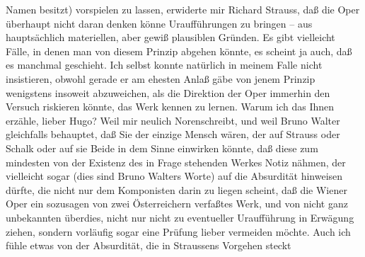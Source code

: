 \begin{ledgroupsized}[t]{13cm}
               Namen besitzt) vorspielen zu lassen, erwiderte mir Richard Strauss, daß die Oper überhaupt
               nicht daran denken könne Uraufführungen zu bringen – aus hauptsächlich materiellen,
               aber gewiß plausiblen Gründen. Es gibt vielleicht Fälle, in denen man von diesem
               Prinzip abgehen könnte, es scheint ja auch, daß es manchmal geschieht. Ich selbst
               konnte natürlich in meinem Falle nicht insistieren, obwohl gerade er am ehesten Anlaß
               gäbe von jenem Prinzip wenigstens insoweit abzuweichen, als die Direktion der Oper immerhin den Versuch riskieren könnte, das
               Werk kennen zu lernen. Warum ich das Ihnen erzähle, lieber Hugo? Weil mir neulich Norenschreibt, und weil Bruno Walter gleichfalls behauptet, daß Sie der einzige Mensch
               wären, der auf Strauss oder Schalk oder auf sie Beide in dem Sinne
               einwirken könnte, daß diese zum mindesten von der Existenz des in Frage stehenden
               Werkes Notiz nähmen, der vielleicht sogar (dies sind Bruno Walters Worte) auf die Absurdität hinweisen dürfte, die
               nicht nur dem Komponisten darin zu liegen scheint, daß die Wiener Oper ein sozusagen von zwei Österreichern verfaßtes Werk, und von nicht ganz unbekannten
               überdies, nicht nur nicht zu eventueller Uraufführung in Erwägung ziehen, sondern
               vorläufig sogar eine Prüfung lieber vermeiden möchte. Auch ich fühle etwas von der
               Absurdität, die in Straussens Vorgehen steckt

\end{ledgroupsized}
